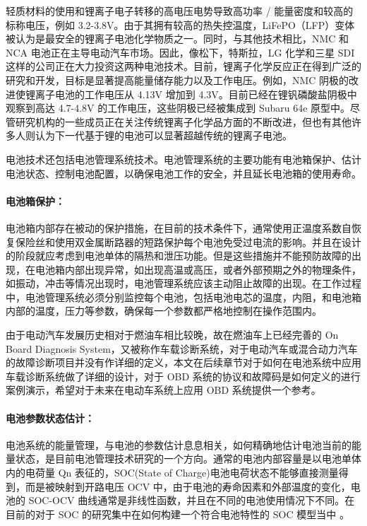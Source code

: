 轻质材料的使用和锂离子电子转移的高电压电势导致高功率 / 能量密度和较高的标称电压，例如 3.2-3.8V。由于其拥有较高的热失控温度，LiFePO（LFP）变体被认为是最安全的锂离子电池化学物质之一。同时，与其他技术相比，NMC 和 NCA 电池正在主导电动汽车市场。因此，像松下，特斯拉，LG 化学和三星 SDI 这样的公司正在大力投资这两种电池技术。目前，锂离子化学反应正在得到广泛的研究和开发，目标是显著提高能量储存能力以及工作电压。例如，NMC 阴极的改进使锂离子电池的工作电压从 4.13V 增加到 4.3V。目前已经在锂钒磷酸盐阴极中观察到高达 4.7-4.8V 的工作电压，这些阴极已经被集成到 Subaru 64e 原型中。尽管研究机构的一些成员正在关注传统锂离子化学品方面的不断改进，但也有其他许多人则认为下一代基于锂的电池可以显著超越传统的锂离子电池。

电池技术还包括电池管理系统技术。电池管理系统的主要功能有电池箱保护、估计电池状态、控制电池配置，以确保电池工作的安全，并且延长电池箱的使用寿命。

\paragraph*{电池箱保护：}电池箱内部存在被动的保护措施，在目前的技术条件下，通常使用正温度系数自恢复保险丝和使用双金属断路器的短路保护每个电池免受过电流的影响。并且在设计的阶段就应考虑到电池单体的隔热和泄压功能。但是这些措施并不能预防故障的出现，在电池箱内部出现异常，如出现高温或高压，或者外部预期之外的物理条件，如振动，冲击等情况出现时，电池管理系统应该主动阻止故障的出现。在工作过程中，电池管理系统必须分别监控每个电池，包括电池电芯的温度，内阻，和电池箱内部的温度，压力等参数，确保每一个参数都严格地控制在操作范围内。

由于电动汽车发展历史相对于燃油车相比较晚，故在燃油车上已经完善的 On Board Diagnosis System，又被称作车载诊断系统，对于电动汽车或混合动力汽车的故障诊断项目并没有作详细的定义，本文在后续章节对于如何在电池系统中应用车载诊断系统做了详细的设计，对于 OBD 系统的协议和故障码是如何定义的进行案例演示，希望对于未来在电动车系统上应用 OBD 系统提供一个参考。

\paragraph*{电池参数状态估计：}电池系统的能量管理，与电池的参数估计息息相关，如何精确地估计电池当前的能量状态，是目前电池管理技术研究的一个方向。通常的电池内部容量是以电池单体内的电荷量 Qn 表征的，SOC(State of Charge)电池电荷状态不能够直接测量得到，而是被映射到开路电压 OCV 中，由于电池的寿命因素和外部温度的变化，电池的 SOC-OCV 曲线通常是非线性函数，并且在不同的电池使用情况下不同。在目前的对于 SOC 的研究集中在如何构建一个符合电池特性的 SOC 模型当中 \cite{BatteryManagementSystemUsedinElectricVehicles}。

